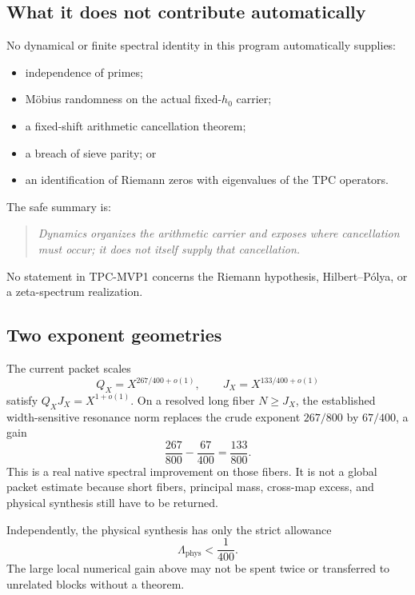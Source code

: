 \subsection{What it does not contribute automatically}

No dynamical or finite spectral identity in this program automatically
supplies:
\begin{itemize}[leftmargin=2em]
\item independence of primes;
\item M\"obius randomness on the actual fixed-\(h_0\) carrier;
\item a fixed-shift arithmetic cancellation theorem;
\item a breach of sieve parity; or
\item an identification of Riemann zeros with eigenvalues of the TPC
  operators.
\end{itemize}
The safe summary is:
\begin{quote}
\emph{Dynamics organizes the arithmetic carrier and exposes where
cancellation must occur; it does not itself supply that
cancellation.}
\end{quote}
No statement in TPC-MVP1 concerns the Riemann hypothesis,
Hilbert--P\'olya, or a zeta-spectrum realization.

\subsection{Two exponent geometries}

The current packet scales
\[
Q_X=X^{267/400+o(1)},
\qquad
J_X=X^{133/400+o(1)}
\]
satisfy \(Q_XJ_X=X^{1+o(1)}\).  On a resolved long fiber
\(N\ge J_X\), the established width-sensitive resonance norm replaces
the crude exponent \(267/800\) by \(67/400\), a gain
\[
\frac{267}{800}-\frac{67}{400}
=\frac{133}{800}.
\]
This is a real native spectral improvement on those fibers.  It is
not a global packet estimate because short fibers, principal mass,
cross-map excess, and physical synthesis still have to be returned.

Independently, the physical synthesis has only the strict allowance
\[
\Lambda_{\mathrm{phys}}<\frac1{400}.
\]
The large local numerical gain above may not be spent twice or
transferred to unrelated blocks without a theorem.
